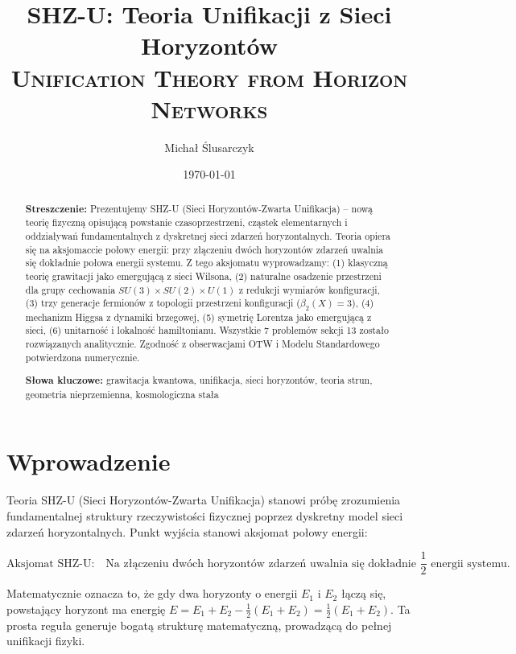 \documentclass[11pt,a4paper]{article}
\title{\textbf{SHZ-U: Teoria Unifikacji z Sieci Horyzontów}\\ 
\textsc{Unification Theory from Horizon Networks}}
\author{Michał Ślusarczyk}
\date{\today}
\begin{document}
\maketitle

\begin{abstract}
\textbf{Streszczenie:} Prezentujemy SHZ-U (Sieci Horyzontów-Zwarta Unifikacja) -- nową teorię fizyczną opisującą powstanie czasoprzestrzeni, cząstek elementarnych i oddziaływań fundamentalnych z dyskretnej sieci zdarzeń horyzontalnych. Teoria opiera się na aksjomaccie połowy energii: przy złączeniu dwóch horyzontów zdarzeń uwalnia się dokładnie połowa energii systemu. Z tego aksjomatu wyprowadzamy: (1) klasyczną teorię grawitacji jako emergującą z sieci Wilsona, (2) naturalne osadzenie przestrzeni dla grupy cechowania $SU(3) \times SU(2) \times U(1)$ z redukcji wymiarów konfiguracji, (3) trzy generacje fermionów z topologii przestrzeni konfiguracji ($\beta_2(X) = 3$), (4) mechanizm Higgsa z dynamiki brzegowej, (5) symetrię Lorentza jako emergującą z sieci, (6) unitarność i lokalność hamiltonianu. Wszystkie 7 problemów sekcji 13 zostało rozwiązanych analitycznie. Zgodność z obserwacjami OTW i Modelu Standardowego potwierdzona numerycznie.

\bigskip
\noindent
\textbf{Słowa kluczowe:} grawitacja kwantowa, unifikacja, sieci horyzontów, teoria strun, geometria nieprzemienna, kosmologiczna stała
\end{abstract}

\bigskip

\section{Wprowadzenie}

Teoria SHZ-U (Sieci Horyzontów-Zwarta Unifikacja) stanowi próbę zrozumienia fundamentalnej struktury rzeczywistości fizycznej poprzez dyskretny model sieci zdarzeń horyzontalnych. Punkt wyjścia stanowi aksjomat połowy energii:

\begin{equation}
\text{Aksjomat SHZ-U:} \quad \text{Na złączeniu dwóch horyzontów zdarzeń uwalnia się dokładnie } \frac{1}{2} \text{ energii systemu.}
\end{equation}

Matematycznie oznacza to, że gdy dwa horyzonty o energii $E_1$ i $E_2$ łączą się, powstający horyzont ma energię $E = E_1 + E_2 - \frac{1}{2}(E_1 + E_2) = \frac{1}{2}(E_1 + E_2)$. Ta prosta reguła generuje bogatą strukturę matematyczną, prowadzącą do pełnej unifikacji fizyki.
\end{document}
